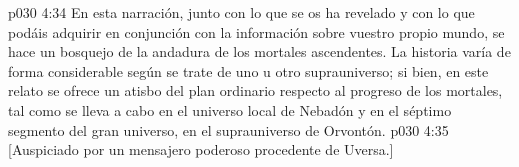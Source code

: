 \vs p030 4:34 \pc En esta narración, junto con lo que se os ha revelado y con lo que podáis adquirir en conjunción con la información sobre vuestro propio mundo, se hace un bosquejo de la andadura de los mortales ascendentes. La historia varía de forma considerable según se trate de uno u otro suprauniverso; si bien, en este relato se ofrece un atisbo del plan ordinario respecto al progreso de los mortales, tal como se lleva a cabo en el universo local de Nebadón y en el séptimo segmento del gran universo, en el suprauniverso de Orvontón.
\vsetoff
\vs p030 4:35 [Auspiciado por un mensajero poderoso procedente de Uversa.]
